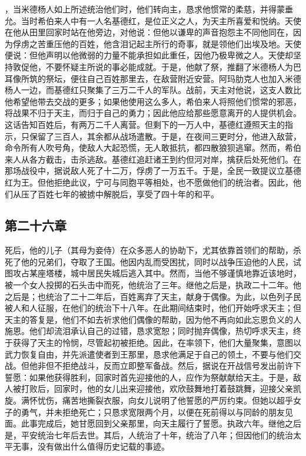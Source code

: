 ，当米德杨人如上所述统治他们时，他们转向主，恳求他惯常的柔慈，并得蒙垂允。当时希伯来人中有一人名基德红，是位正义之人，为天主所喜爱和悦纳。天使在他从田里回家时站在他旁边，对他说：但他以谦卑的声音抱怨主不同他同在，因为俘虏之苦重压他的百姓，他含泪记起主所行的奇事，就是领他们出埃及地。天使便说：但他声明以他微弱的力量不能承担如此重任，因他乃极卑微之人。天使却坚持敦促他，不要怀疑主所说的事必能成就。于是，他献了祭，推翻了米德杨人为巴耳像所筑的祭坛，便往自己百姓那里去，在敌营附近安营。阿玛肋克人也加入米德杨人一边，而基德红只聚集了三万二千人的军队。战前，天主对他说，这支人数比他希望他带去交战的更多；如果他使用这么多人，希伯来人将照他们惯常的邪恶，将战果不归于天主，而归于自己的勇力；因此他应给那些愿意离开的人提供机会。这话告知百姓后，有两万二千人离营。但剩下的一万人中，基德红遵照天主的指示，只保留了三百人，其余都从战场遣散。于是，在夜间三更时分，他进入敌营，命令所有人吹号角，使敌人大起恐慌，无人敢抵抗，都四散狼狈逃窜。然而，希伯来人从各方截击，击杀逃敌。基德红追赶诸王到约但河对岸，擒获后处死他们。在那场战役中，据说敌人死了十二万，俘虏了一万五千。于是，全民一致提议立基德红为王。但他拒绝此议，宁可与同胞平等相处，也不愿做他们的统治者。因此，他们从压了百姓七年的被掳中解脱后，享受了四十年的和平。\par


\subsection{第二十六章}

死后，他的儿子（其母为妾侍）在众多恶人的协助下，尤其依靠首领们的帮助，杀死了他的兄弟们，夺取了王国。他因内乱而受困扰，同时以战争压迫他的人民，试图攻占某座塔楼，城中居民失城后逃入其中。然而，当他不够谨慎地靠近该地时，被一个女人投掷的石头击中而死，他统治了三年。继他之后是，执政二十二年。他之后是；也统治了二十二年后，百姓离弃了天主，献身于偶像。为此，以色列子民被人和人征服，在他们的统治下十八年。在此期间结束时，他们开始呼求天主；但天主的答复是，他们不如去祈求他们偶像的帮助，因为他不再向如此忘恩负义的人施恩。他们却流泪承认自己的过错，恳求宽恕；同时抛弃偶像，热切呼求天主，终于获得了天主的怜悯，尽管起初被拒绝。因此，在率领下，他们大量聚集，意图以武力恢复自由，并先派遣使者到王那里，恳求他满足于自己的领土，不要与他们交战。但他非但不拒绝战斗，反而立即整军备战。然后，据说在开战信号发出前许下誓愿：如果他获得胜利，回家时首先迎接他的人，应作为祭献献给天主。于是，敌人被打败后，回家时，他的女儿出来迎接他，欢欣鼓舞地打着鼓跳舞，迎接父亲凯旋。满怀忧伤，痛苦地撕裂衣服，向女儿说明了他誓愿的严厉约束。但她以超乎女子的勇气，并未拒绝死亡；只恳求宽限两个月，以便在死前得以与同龄的朋友见面。此事完成后，她甘愿回到父亲那里，向天主履行了誓愿。执政六年。继他之后是，平安统治七年后去世。其后，人统治了十年，统治了八年；但因他们的统治太平无事，没有做出什么值得历史记载的事迹。\par

